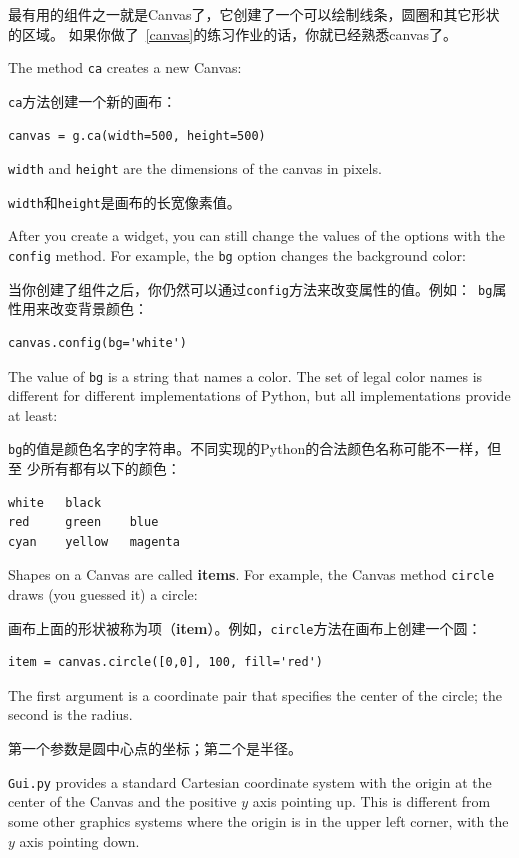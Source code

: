 \documentclass[10pt]{book}
\begin{document}
\begin{CJK}{UTF8}{gbsn}
最有用的组件之一就是Canvas了，它创建了一个可以绘制线条，圆圈和其它形状的区域。
如果你做了~\ref{canvas}的练习作业的话，你就已经熟悉canvas了。

The method {\tt ca} creates a new Canvas:

{\tt ca}方法创建一个新的画布：

\begin{verbatim}
canvas = g.ca(width=500, height=500)
\end{verbatim}
%
{\tt width} and {\tt height} are the dimensions of the canvas
in pixels.  

{\tt width}和{\tt height}是画布的长宽像素值。

After you create a widget, you can still change the values of
the options with the
{\tt config} method.  For example, the {\tt bg} option changes
the background color:

当你创建了组件之后，你仍然可以通过{\tt config}方法来改变属性的值。例如：{\tt
bg}属性用来改变背景颜色：

\begin{verbatim}
canvas.config(bg='white')
\end{verbatim}
%
The value of {\tt bg} is a string
that names a color.  The set of legal color names is different
for different implementations of Python, but all implementations
provide at least:

{\tt bg}的值是颜色名字的字符串。不同实现的Python的合法颜色名称可能不一样，但至
少所有都有以下的颜色：

\begin{verbatim}
white   black
red     green    blue   
cyan    yellow   magenta
\end{verbatim}
%
Shapes on a Canvas are called {\bf items}.  For example,
the Canvas method {\tt circle} draws (you guessed it) a circle:

画布上面的形状被称为项（{\bf item}）。例如，{\tt circle}方法在画布上创建一个圆：

\begin{verbatim}
item = canvas.circle([0,0], 100, fill='red')
\end{verbatim}
%
The first argument is a coordinate pair that specifies the
center of the circle; the second is the radius.

第一个参数是圆中心点的坐标；第二个是半径。

{\tt Gui.py} provides a standard Cartesian coordinate system with
the origin at the center of the Canvas and the positive $y$ axis
pointing up.  This is different from some other graphics systems
where the origin is in the upper left corner, with the $y$ axis
pointing down.


\end{CJK}
\end{document}
